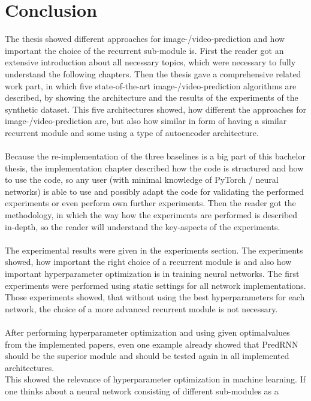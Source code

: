 \section{Conclusion} \label{section::conclusion}
 The thesis showed different approaches for image-/video-prediction and how important the choice of the recurrent sub-module is.
 First the reader got an extensive introduction
 about all necessary topics, which were necessary to fully understand the following chapters. Then the thesis gave a comprehensive related work part, in which
 five state-of-the-art image-/video-prediction algorithms are described, by showing the architecture and the results of the experiments of the synthetic dataset.
 This five architectures showed, how different the approaches for image-/video-prediction are, but also how similar in form of
 having a similar recurrent module and some using a type of autoencoder architecture.
 \\\\
 Because the re-implementation
 of the three baselines is a big part of this bachelor thesis, the implementation chapter described how the code is structured and how to use the code, so any
 user (with minimal knowledge of PyTorch / neural networks) is able to use and possibly adapt the code for validating the performed experiments or even perform
 own further experiments. Then the reader got the methodology, in which the way how the experiments are performed is described in-depth, so the reader will 
 understand the key-aspects of the experiments.
 \\\\
 The experimental results were given in the experiments section.
 The experiments showed, how important the right choice of a recurrent module is and also how important hyperparameter optimization is in training neural networks.
 The first experiments were performed using static settings for all network implementations. Those experiments showed, that without using the \glqq best\grqq 
 hyperparameters for each network, the choice of a more advanced recurrent module is not necessary.
 \\\\ 
 After performing hyperparameter optimization and using given \glqq optimal\grqq values 
 from the implemented papers, even one example already showed that
 PredRNN should be the superior module and should be tested again in all implemented architectures.\\
 This showed the relevance of hyperparameter optimization in machine learning. If one thinks about a neural network consisting of different sub-modules as a
